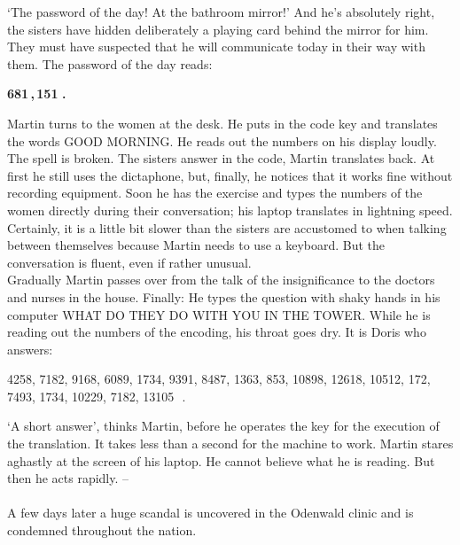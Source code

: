 `The password of the day! At the bathroom mirror!' 
And he's absolutely right, the sisters have hidden deliberately a playing card behind the mirror for him. 
They must have suspected that he will communicate today in their way with them. 
The password of the day reads: 
\begin{center} 
{\bf 681\,,\,151\,\,.}
\end{center} 
Martin turns to the women at the desk. 
He puts in the code key and translates the words GOOD MORNING. 
He reads out the numbers on his display loudly. 
The spell is broken. 
The sisters answer in the code, Martin translates back. 
At first he still uses the dictaphone, but, finally, he notices that it works fine without recording equipment. 
Soon he has the exercise and types the numbers of the women directly during their conversation; his laptop 
translates in lightning speed. 
Certainly, it is a little bit slower than the sisters are accustomed to when talking between themselves because Martin  
needs to use a keyboard. 
But the conversation is fluent, even if rather unusual. \\ 
Gradually Martin passes over from the talk of the insignificance to the doctors and nurses in the house. 
Finally: He types the question with shaky hands in his computer WHAT DO THEY DO WITH YOU IN THE TOWER.
While he is reading out the numbers of the encoding, his throat goes dry. 
It is Doris who answers: 
\begin{center} 
4258, 7182, 9168, 6089, 1734, 9391, 8487, 1363, 853, 10898, 12618, 10512, 172, 7493, 1734, 10229, 7182, 13105 \,\,. 
\end{center} 
`A short answer', thinks Martin, before he operates the key for the execution of the translation. 
It takes less than a second for the machine to work. 
Martin stares aghastly at the screen of his laptop. 
He cannot believe what he is reading. 
But then he acts rapidly. -- \\ \\ 
A few days later a huge scandal is uncovered in the Odenwald clinic and is condemned throughout the nation.

\[\]
\[\]
\[\]
\[\]
\hrulefill
\[\]
\[\]

